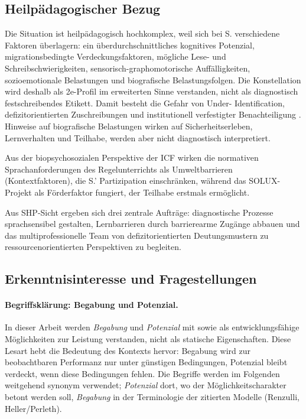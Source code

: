 \documentclass[ngerman, a4paper]{article}
\begin{document}
\subsection*{Heilpädagogischer Bezug}
 
Die Situation ist heilpädagogisch hochkomplex, weil sich bei S. verschiedene
Faktoren überlagern: ein überdurchschnittliches kognitives Potenzial,
migrationsbedingte Verdeckungsfaktoren, mögliche Lese- und Schreibschwierigkeiten,
sensorisch-graphomotorische Auffälligkeiten, sozioemotionale Belastungen und
biografische Belastungsfolgen. Die Konstellation wird deshalb als 2e-Profil im
erweiterten Sinne verstanden, nicht als diagnostisch festschreibendes Etikett.
Damit besteht die Gefahr von Under-
Identification, 
defizitorientierten Zuschreibungen und institutionell verfestigter Benachteiligung
\parencite[S.\,63--77]{kappus2010migration}. Hinweise auf biografische
Belastungen wirken auf Sicherheitserleben, Lernverhalten und Teilhabe,
werden aber nicht diagnostisch interpretiert.

Aus der biopsychosozialen Perspektive der ICF wirken die normativen
Sprachanforderungen des Regelunterrichts als Umweltbarrieren (Kontextfaktoren),
die S.' Partizipation einschränken, während das SOLUX-Projekt als Förderfaktor
fungiert, der Teilhabe erstmals ermöglicht.

Aus SHP-Sicht ergeben sich drei zentrale Aufträge: diagnostische Prozesse sprachsensibel
gestalten, Lernbarrieren durch barrierearme Zugänge abbauen und das multiprofessionelle
Team von defizitorientierten Deutungsmustern zu ressourcenorientierten Perspektiven zu begleiten.
 
\subsection*{Erkenntnisinteresse und Fragestellungen}

\paragraph{Begriffsklärung: Begabung und Potenzial.}
In dieser Arbeit werden \textit{Begabung} und \textit{Potenzial} mit
\textcite{stern2025intelligenz} sowie \textcite[S.\,218]{muelleroppliger2021begabungsmodelle}
als entwicklungsfähige Möglichkeiten zur Leistung verstanden, nicht als
statische Eigenschaften. Diese Lesart hebt die Bedeutung des Kontexts hervor:
Begabung wird zur beobachtbaren Performanz nur unter günstigen Bedingungen,
Potenzial bleibt verdeckt, wenn diese Bedingungen fehlen. Die Begriffe werden
im Folgenden weitgehend synonym verwendet; \textit{Potenzial} dort, wo der
Möglichkeitscharakter betont werden soll, \textit{Begabung} in der Terminologie 
der zitierten Modelle (Renzulli, Heller/Perleth).
\end{document}

